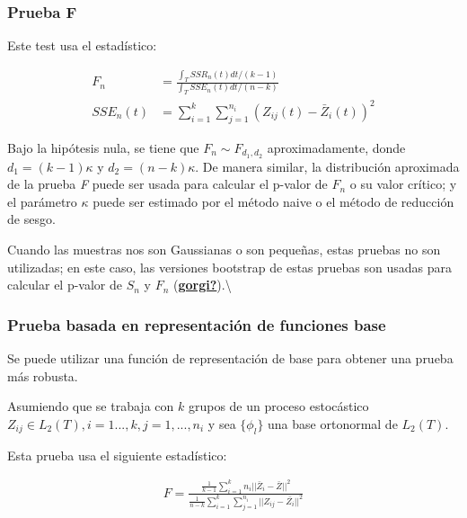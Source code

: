\documentclass[
]{book}
\begin{document}
\hypertarget{prueba-f}{%
\subsubsection*{Prueba F}\label{prueba-f}}

Este test usa el estadístico:

\begin{align}
    F_n&=\frac{\int_T SSR_n(t)dt/(k-1)}{\int_T SSE_n(t)dt/(n-k)}\\
    SSE_n(t)&=\sum_{i=1}^k\sum_{j=1}^{n_i}(Z_{ij}(t)-\bar{Z}_i(t))^2
\end{align}

Bajo la hipótesis nula, se tiene que \(F_n \sim F_{d_1,d_2}\) aproximadamente, donde \(d_1=(k-1)\kappa\) y \(d_2=(n-k)\kappa\). De manera similar, la distribución aproximada de la prueba \textit{F} puede ser usada para calcular el p-valor de \(F_n\) o su valor crítico; y el parámetro \(\kappa\) puede ser estimado por el método naive o el método de reducción de sesgo.

Cuando las muestras nos son Gaussianas o son pequeñas, estas pruebas no son utilizadas; en este caso, las versiones bootstrap de estas pruebas son usadas para calcular el p-valor de \(S_n\) y \(F_n\) (\protect\hyperlink{ref-gorgi}{\textbf{gorgi?}}).\textbackslash{}

\hypertarget{prueba-basada-en-representaciuxf3n-de-funciones-base}{%
\subsubsection*{Prueba basada en representación de funciones base}\label{prueba-basada-en-representaciuxf3n-de-funciones-base}}

Se puede utilizar una función de representación de base para obtener una prueba más robusta.

Asumiendo que se trabaja con \(k\) grupos de un proceso estocástico \(Z_{ij}\in L_2(T), i=1...,k,j=1,...,n_i\) y sea \(\{\phi_l\}\) una base ortonormal de \(L_2(T)\).

Esta prueba usa el siguiente estadístico:

\begin{align}
    F=\frac{\frac{1}{k-1}\sum_{i=1}^k n_i||\bar{Z}_i-\bar{Z}||^2}{\frac{1}{n-k}\sum_{i=1}^k\sum_{j=1}^{n_i} ||Z_{ij}-\bar{Z_i}||^2}
\end{align}
\end{document}
